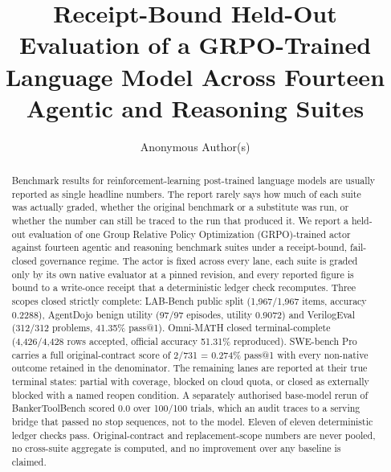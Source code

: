\documentclass[runningheads]{llncs}
\begin{document}
\sloppy

\title{Receipt-Bound Held-Out Evaluation of a GRPO-Trained Language Model Across Fourteen Agentic and Reasoning Suites}

\author{Anonymous Author(s)}

\maketitle

\begin{abstract}
Benchmark results for reinforcement-learning post-trained language models are
usually reported as single headline numbers. The report rarely says how much of
each suite was actually graded, whether the original benchmark or a substitute
was run, or whether the number can still be traced to the run that produced it.
We report a held-out evaluation of one Group Relative Policy Optimization
(GRPO)-trained actor against fourteen agentic and reasoning benchmark suites
under a receipt-bound, fail-closed governance regime. The actor is fixed across
every lane, each suite is graded only by its own native evaluator at a pinned
revision, and every reported figure is bound to a write-once receipt that a
deterministic ledger check recomputes. Three scopes closed strictly complete:
LAB-Bench public split (1,967/1,967 items, accuracy 0.2288), AgentDojo benign
utility (97/97 episodes, utility 0.9072) and VerilogEval (312/312 problems,
41.35\% pass@1). Omni-MATH closed terminal-complete (4,426/4,428 rows
accepted, official accuracy 51.31\% reproduced). SWE-bench Pro carries a full original-contract score of
2/731 = 0.274\% pass@1 with every non-native outcome retained in the
denominator. The remaining lanes are reported at their true terminal states:
partial with coverage, blocked on cloud quota, or closed as externally blocked
with a named reopen condition. A separately authorised base-model rerun of
BankerToolBench scored 0.0 over 100/100 trials, which an audit traces to a
serving bridge that passed no stop sequences, not to the model. Eleven of eleven
deterministic ledger checks pass. Original-contract and replacement-scope
numbers are never pooled, no cross-suite aggregate is computed, and no
improvement over any baseline is claimed.
\end{abstract}
\end{document}

